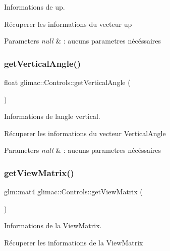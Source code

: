 Informations de up. 

Récuperer les informations du vecteur up


\begin{DoxyParams}{Parameters}
{\em null} & \+: aucuns parametres nécéssaires \\
\hline
\end{DoxyParams}
\mbox{\label{classglimac_1_1Controls_a098df45aa771926c1b25e4ef2cdbf52a}} 
\subsubsection{\texorpdfstring{get\+Vertical\+Angle()}{getVerticalAngle()}}
{\footnotesize\ttfamily float glimac\+::\+Controls\+::get\+Vertical\+Angle (\begin{DoxyParamCaption}{ }\end{DoxyParamCaption})}



Informations de l\textquotesingle{}angle vertical. 

Récuperer les informations du vecteur Vertical\+Angle


\begin{DoxyParams}{Parameters}
{\em null} & \+: aucuns parametres nécéssaires \\
\hline
\end{DoxyParams}
\mbox{\label{classglimac_1_1Controls_ac71089c5a9f4f1d78c5bbfeec6fef620}} 
\subsubsection{\texorpdfstring{get\+View\+Matrix()}{getViewMatrix()}}
{\footnotesize\ttfamily glm\+::mat4 glimac\+::\+Controls\+::get\+View\+Matrix (\begin{DoxyParamCaption}{ }\end{DoxyParamCaption})}



Informations de la View\+Matrix. 

Récuperer les informations de la View\+Matrix


